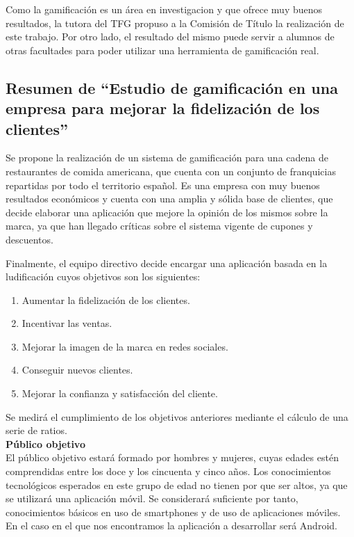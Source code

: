 \documentclass[twoside]{report}
\begin{document}
Como la gamificación es un área en investigacion y que ofrece muy buenos resultados, la tutora del TFG propuso a la Comisión de Título la realización de este trabajo. Por otro lado, el resultado del mismo puede servir a alumnos de otras facultades para poder utilizar una herramienta de gamificación real.

\subsection{Resumen de “Estudio de gamificación en una empresa para mejorar la fidelización de los clientes”}

Se propone la realización de un sistema de gamificación para una cadena de restaurantes de comida americana, que cuenta con un conjunto de franquicias repartidas por todo el territorio español. Es una empresa con muy buenos resultados económicos y cuenta con una amplia y sólida base de clientes, que decide elaborar una aplicación que mejore la opinión de los mismos sobre la marca, ya que han llegado críticas sobre el sistema vigente de cupones y descuentos.

Finalmente, el equipo directivo decide encargar una aplicación basada en la ludificación cuyos objetivos son los siguientes:

\begin{enumerate}
\item Aumentar la fidelización de los clientes.
\item Incentivar las ventas.
\item Mejorar la imagen de la marca en redes sociales.
\item Conseguir nuevos clientes.
\item Mejorar la confianza y satisfacción del cliente. 
\end{enumerate}

Se medirá el cumplimiento de los objetivos anteriores mediante el cálculo de una serie de ratios.\\

\textbf{Público objetivo}\\

El público objetivo estará formado por hombres y mujeres, cuyas edades estén comprendidas entre los doce y los cincuenta y cinco años. 
Los conocimientos tecnológicos esperados en este grupo de edad no tienen por que ser altos, ya que se utilizará una aplicación móvil. Se considerará suficiente por tanto, conocimientos básicos en uso de smartphones y de uso de aplicaciones móviles. En el caso en el que nos encontramos la aplicación a desarrollar será Android.
\end{document}
